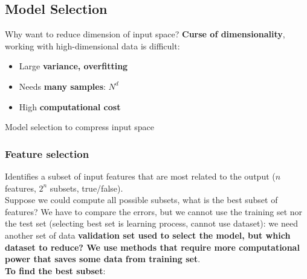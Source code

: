 \subsection{Model Selection}
    Why want to reduce dimension of input space? \textbf{Curse of dimensionality}, working with high-dimensional data is difficult:
    \begin{itemize}
        \item Large \textbf{variance, overfitting}
        \item Needs \textbf{many samples}: $N^d$
        \item High \textbf{computational cost}
    \end{itemize}
    Model selection to compress input space
\subsubsection{Feature selection}
    Identifies a subset of input features that are most related to the output ($n$ features, $2^n$ subsets, true/false).\\
    Suppose we could compute all possible subsets, what is the best subset of features? We have to compare the errors, but we cannot use the training set nor the test set (selecting best set is learning process, cannot use dataset): we need another set of data \textbf{validation set used to select the model, but which dataset to reduce? We use methods that require more computational power that saves some data from training set}.\\
    \textbf{To find the best subset}:
